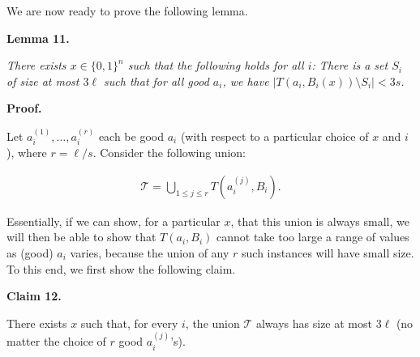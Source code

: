 \documentclass[10pt,a4paper]{article}
\begin{document}
We are now ready to prove the following lemma.\par





\par\medskip\noindent\textbf{
\textbf{Lemma 11}\textbf{.}
}\par



\emph{There exists $x\in\{0,1\}^{n}$ such that the following holds for all $i$: There is a set $S_{i}$ of size at most $3\ell$ such that for all good $a_{i}$, we have $|T(a_{i},B_{i}(x))\setminus S_{i}|<3s$.}\par







\par\medskip\noindent\textbf{Proof.}\par




Let $a_{i}^{(1)},\dots,a_{i}^{(r)}$ each be good $a_{i}$ (with respect to a particular choice of $x$ and $i$), where $r=\ell/s$. Consider the following union:\par


\[\begin{gathered}
{\mathcal{T}}=\bigcup_{1\leq j\leq r}T(a_{i}^{(j)},B_{i}).
\end{gathered}\]


Essentially, if we can show, for a particular $x$, that this union is always small, we will then be able to show that $T(a_{i},B_{i})$ cannot take too large a range of values as (good) $a_{i}$ varies, because the union of any $r$ such instances will have small size. To this end, we first show the following claim.\par





\par\medskip\noindent\textbf{
Claim 12. 
}\par



There exists $x$ such that, for every $i$, the union ${\mathcal{T}}$ always has size at most $3\ell$ (no matter the choice of $r$ good $a_{i}^{(j)}$’s).\par



\end{document}
